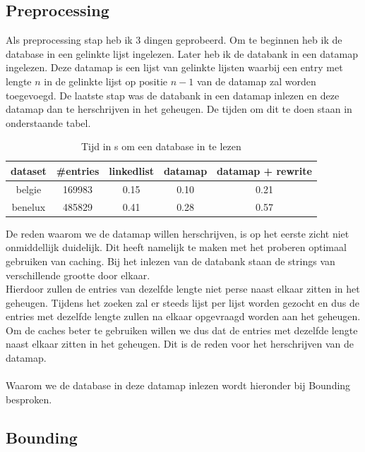 \documentclass[11pt]{article}
\begin{document}
\subsection{Preprocessing}
Als preprocessing stap heb ik 3 dingen geprobeerd. Om te beginnen heb ik de database in een gelinkte lijst ingelezen. Later heb ik de databank in een datamap ingelezen. Deze datamap is een lijst van gelinkte lijsten waarbij een entry met lengte $n$ in de gelinkte lijst op positie $n-1$ van de datamap zal worden toegevoegd. De laatste stap was de databank in een datamap inlezen en deze datamap dan te herschrijven in het geheugen. De tijden om dit te doen staan in onderstaande tabel.
\begin{table}[H]
        \centering
        \begin{tabular}{ |c|c|c|c|c| }
                \hline
                dataset & \#entries & linkedlist & datamap & datamap + rewrite\\
                \hline
                belgie  & 169983 & 0.15 & 0.10 & 0.21\\
                benelux & 485829 & 0.41 & 0.28 & 0.57\\
                \hline
        \end{tabular}
        \caption{Tijd in s om een database in te lezen}
\end{table}

De reden waarom we de datamap willen herschrijven, is op het eerste zicht niet onmiddellijk duidelijk. Dit heeft namelijk te maken met het proberen optimaal gebruiken van caching. Bij het inlezen van de databank staan de strings van verschillende grootte door elkaar. \\Hierdoor zullen de entries van dezelfde lengte niet perse naast elkaar zitten in het geheugen. Tijdens het zoeken zal er steeds lijst per lijst worden gezocht en dus de entries met dezelfde lengte zullen na elkaar opgevraagd worden aan het geheugen. Om de caches beter te gebruiken willen we dus dat de entries met dezelfde lengte naast elkaar zitten in het geheugen. Dit is de reden voor het herschrijven van de datamap.\\
\\
Waarom we de database in deze datamap inlezen wordt hieronder bij Bounding besproken.
\newpage
\subsection{Bounding}
\end{document}
